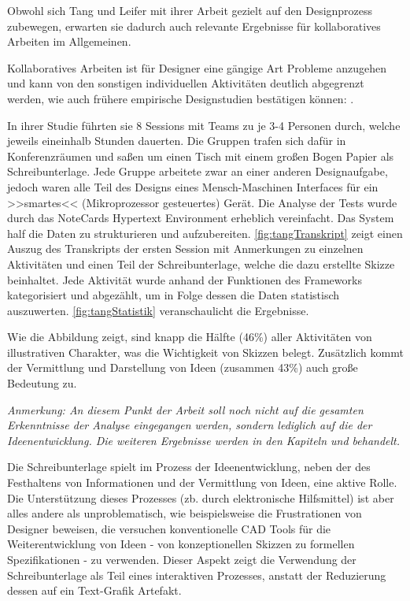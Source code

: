 \medskip Obwohl sich Tang und Leifer mit ihrer Arbeit gezielt auf den Designprozess zubewegen, erwarten sie dadurch auch relevante Ergebnisse für kollaboratives Arbeiten im Allgemeinen. \par Kollaboratives Arbeiten ist für Designer eine gängige Art Probleme anzugehen und kann von den sonstigen individuellen Aktivitäten deutlich abgegrenzt werden, wie auch frühere empirische Designstudien bestätigen können: \citep{Ullman:1987, Ballay:1987, Akin:1978, Lera:1983}.

\medskip In ihrer Studie führten sie 8 Sessions mit Teams zu je 3-4 Personen durch, welche jeweils eineinhalb Stunden dauerten. Die Gruppen trafen sich dafür in Konferenzräumen und saßen um einen Tisch mit einem großen Bogen Papier als Schreibunterlage. Jede Gruppe arbeitete zwar an einer anderen Designaufgabe, jedoch waren alle Teil des Designs eines Mensch-Maschinen Interfaces für ein >>smartes<< (Mikroprozessor gesteuertes) Gerät.
Die Analyse der Tests wurde durch das NoteCards Hypertext Environment \citep{Halasz:1986:NN:29933.30859} erheblich vereinfacht. Das System half die Daten zu strukturieren und aufzubereiten. \autoref{fig:tangTranskript} zeigt einen Auszug des Transkripts der ersten Session mit Anmerkungen zu einzelnen Aktivitäten und einen Teil der Schreibunterlage, welche die dazu erstellte Skizze beinhaltet. Jede Aktivität wurde anhand der Funktionen des Frameworks kategorisiert und abgezählt, um in Folge dessen die Daten statistisch auszuwerten. \autoref{fig:tangStatistik} veranschaulicht die Ergebnisse.

\medskip Wie die Abbildung zeigt, sind knapp die Hälfte (46\%) aller Aktivitäten von illustrativen Charakter, was die Wichtigkeit von Skizzen belegt. Zusätzlich kommt der Vermittlung und Darstellung von Ideen (zusammen 43\%) auch große Bedeutung zu.\par
\medskip \emph{Anmerkung: \graffito{\(\clubsuit\)} An diesem Punkt der Arbeit soll noch nicht auf die gesamten Erkenntnisse der Analyse eingegangen werden, sondern lediglich auf die der Ideenentwicklung. Die weiteren Ergebnisse werden in den Kapiteln  und  behandelt.}

\medskip Die Schreibunterlage spielt im Prozess der Ideenentwicklung, neben der des Festhaltens von Informationen und der Vermittlung von Ideen, eine aktive Rolle. Die Unterstützung dieses Prozesses (zb. durch elektronische Hilfsmittel) ist aber alles andere als unproblematisch, wie beispielsweise die Frustrationen von Designer beweisen, die versuchen konventionelle CAD Tools für die Weiterentwicklung von Ideen - von konzeptionellen Skizzen zu formellen Spezifikationen - zu verwenden. Dieser Aspekt zeigt die Verwendung der Schreibunterlage als Teil eines interaktiven Prozesses, anstatt der Reduzierung dessen auf ein Text-Grafik Artefakt. 

